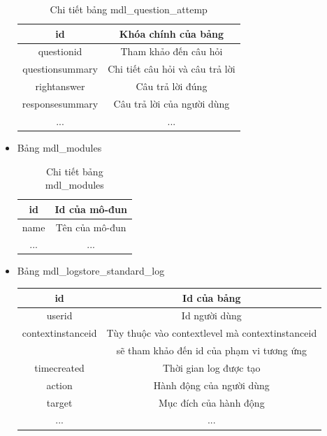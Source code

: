 \begin{itemize}
\begin{center}
\begin{table}[!htp]
			\centering
			\begin{tabular}{|c|c|}
				\hline 
				id & Khóa chính của bảng \\ 
				\hline 
				questionid & Tham khảo đến câu hỏi \\ 
				\hline 
				questionsummary & Chi tiết câu hỏi và câu trả lời \\ 
				\hline 
				rightanswer & Câu trả lời đúng \\
				\hline
				responsesummary & Câu trả lời của người dùng \\
				\hline
				... & ... \\ 
				\hline 
			\end{tabular} 
			\caption{Chi tiết bảng mdl\_question\_attemp}
			\label{bang15}
		\end{table}
	\end{center}
	\newpage
	\item Bảng mdl\_modules
	\begin{center}
		\begin{table}[!htp]
			\centering
			\begin{tabular}{|c|c|}
				\hline 
				id & Id của mô-đun \\ 
				\hline 
				name & Tên của mô-đun \\ 
				\hline
				... & ... \\ 
				\hline 
			\end{tabular} 
			\caption{Chi tiết bảng mdl\_modules}
			\label{bang16}
		\end{table}
	\end{center}
	\item Bảng mdl\_logstore\_standard\_log
	\begin{center}
		\begin{table}[!htp]
			\centering
			\begin{tabular}{|c|c|}
				\hline 
				id & Id của bảng \\ 
				\hline 
				userid & Id người dùng \\ 
				\hline
				contextinstanceid & Tùy thuộc vào contextlevel mà contextinstanceid \\ & sẽ tham khảo đến id của phạm vi tương ứng \\
				\hline
				timecreated & Thời gian log được tạo \\ 
				\hline
				action & Hành động của người dùng \\
				\hline 
				target & Mục đích của hành động \\
				\hline
				... & ... \\ 

\end{tabular}
\end{table}
\end{center}
\end{itemize}
